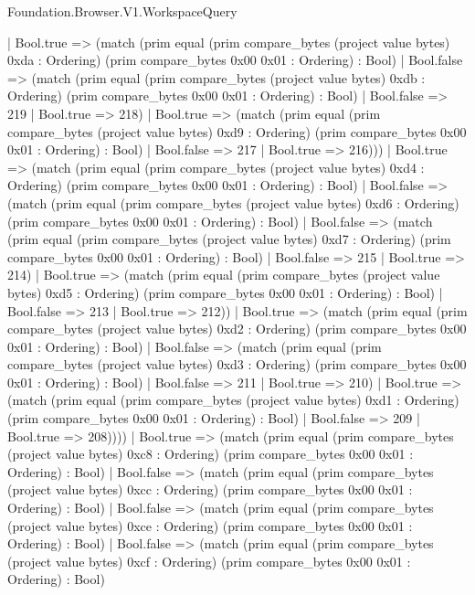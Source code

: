 \begin{lexlean}{Foundation.Browser.V1.WorkspaceQuery}
\begin{semanticmodule}
{                | Bool.true => (match (prim equal (prim compare_bytes (project value bytes) 0xda : Ordering) (prim compare_bytes 0x00 0x01 : Ordering) : Bool)
                  | Bool.false => (match (prim equal (prim compare_bytes (project value bytes) 0xdb : Ordering) (prim compare_bytes 0x00 0x01 : Ordering) : Bool)
                    | Bool.false => 219
                    | Bool.true => 218)
                  | Bool.true => (match (prim equal (prim compare_bytes (project value bytes) 0xd9 : Ordering) (prim compare_bytes 0x00 0x01 : Ordering) : Bool)
                    | Bool.false => 217
                    | Bool.true => 216)))
              | Bool.true => (match (prim equal (prim compare_bytes (project value bytes) 0xd4 : Ordering) (prim compare_bytes 0x00 0x01 : Ordering) : Bool)
                | Bool.false => (match (prim equal (prim compare_bytes (project value bytes) 0xd6 : Ordering) (prim compare_bytes 0x00 0x01 : Ordering) : Bool)
                  | Bool.false => (match (prim equal (prim compare_bytes (project value bytes) 0xd7 : Ordering) (prim compare_bytes 0x00 0x01 : Ordering) : Bool)
                    | Bool.false => 215
                    | Bool.true => 214)
                  | Bool.true => (match (prim equal (prim compare_bytes (project value bytes) 0xd5 : Ordering) (prim compare_bytes 0x00 0x01 : Ordering) : Bool)
                    | Bool.false => 213
                    | Bool.true => 212))
                | Bool.true => (match (prim equal (prim compare_bytes (project value bytes) 0xd2 : Ordering) (prim compare_bytes 0x00 0x01 : Ordering) : Bool)
                  | Bool.false => (match (prim equal (prim compare_bytes (project value bytes) 0xd3 : Ordering) (prim compare_bytes 0x00 0x01 : Ordering) : Bool)
                    | Bool.false => 211
                    | Bool.true => 210)
                  | Bool.true => (match (prim equal (prim compare_bytes (project value bytes) 0xd1 : Ordering) (prim compare_bytes 0x00 0x01 : Ordering) : Bool)
                    | Bool.false => 209
                    | Bool.true => 208))))
            | Bool.true => (match (prim equal (prim compare_bytes (project value bytes) 0xc8 : Ordering) (prim compare_bytes 0x00 0x01 : Ordering) : Bool)
              | Bool.false => (match (prim equal (prim compare_bytes (project value bytes) 0xcc : Ordering) (prim compare_bytes 0x00 0x01 : Ordering) : Bool)
                | Bool.false => (match (prim equal (prim compare_bytes (project value bytes) 0xce : Ordering) (prim compare_bytes 0x00 0x01 : Ordering) : Bool)
                  | Bool.false => (match (prim equal (prim compare_bytes (project value bytes) 0xcf : Ordering) (prim compare_bytes 0x00 0x01 : Ordering) : Bool)
}
\end{semanticmodule}
\end{lexlean}
